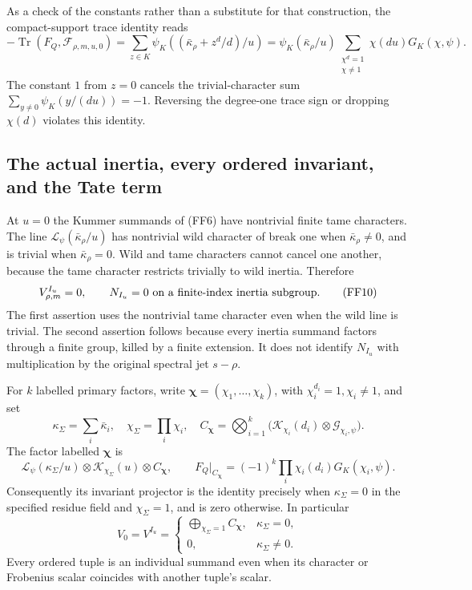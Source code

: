 \documentclass[11pt,a4paper]{article}
\theoremstyle{definition}
\begin{document}
As a check of the constants rather than a substitute for that
construction, the compact-support trace identity reads
\[
 -\operatorname{Tr}(F_Q,\mathcal F_{\rho,m,u,0})
 =\sum_{z\in K}\psi_K((\bar\kappa_\rho+z^d/d)/u)
 =\psi_K(\bar\kappa_\rho/u)
       \sum_{\substack{\chi^d=1\\\chi\ne1}}
                \chi(du)G_K(\chi,\psi).               \tag{FF9}
\]
The constant \(1\) from \(z=0\) cancels the trivial-character
sum \(\sum_{y\ne0}\psi_K(y/(du))=-1\).  Reversing the
degree-one trace sign or dropping \(\chi(d)\) violates this identity.

\subsection{The actual inertia, every ordered invariant, and the Tate term}

At \(u=0\) the Kummer summands of (FF6) have nontrivial finite tame
characters.  The line \(\mathcal L_\psi(\bar\kappa_\rho/u)\) has
nontrivial wild character of break one when \(\bar\kappa_\rho\ne0\),
and is trivial when \(\bar\kappa_\rho=0\).
Wild and tame characters cannot cancel one another, because the tame
character restricts trivially to wild inertia.  Therefore
\[
 V_{\rho,m}^{I_u}=0,\qquad
 N_{I_u}=0\ \hbox{on a finite-index inertia subgroup}. \tag{FF10}
\]
The first assertion uses the nontrivial tame character even when the
wild line is trivial.  The second assertion follows because every
inertia summand factors through a finite group, killed by a finite
extension.  It does not identify \(N_{I_u}\) with multiplication by
the original spectral jet \(s-\rho\).

For \(k\) labelled primary factors, write
\(\boldsymbol\chi=(\chi_1,\ldots,\chi_k)\), with
\(\chi_i^{d_i}=1,\chi_i\ne1\), and set
\[
 \kappa_\Sigma=\sum_i\bar\kappa_i,\quad
 \chi_\Sigma=\prod_i\chi_i,\quad
 C_{\boldsymbol\chi}
   =\bigotimes_{i=1}^k
        \bigl(\mathcal K_{\chi_i}(d_i)
                   \otimes\mathcal G_{\chi_i,\psi}\bigr).
                                                               \tag{FF11}
\]
The factor labelled \(\boldsymbol\chi\) is
\[
 \mathcal L_\psi(\kappa_\Sigma/u)\otimes
        \mathcal K_{\chi_\Sigma}(u)\otimes C_{\boldsymbol\chi},
 \qquad
 F_Q|_{C_{\boldsymbol\chi}}
       =(-1)^k\prod_i\chi_i(d_i)G_K(\chi_i,\psi).        \tag{FF12}
\]
Consequently its invariant projector is the identity precisely when
\(\kappa_\Sigma=0\) in the specified residue field and
\(\chi_\Sigma=1\), and is zero otherwise.  In particular
\[
 V_0=V^{I_u}
   =\begin{cases}
      \displaystyle\bigoplus_{\chi_\Sigma=1}
                         C_{\boldsymbol\chi},&\kappa_\Sigma=0,\\
      0,&\kappa_\Sigma\ne0 .
     \end{cases}                                             \tag{FF13}
\]
Every ordered tuple is an individual summand even when its character
or Frobenius scalar coincides with another tuple's scalar.
\end{document}
